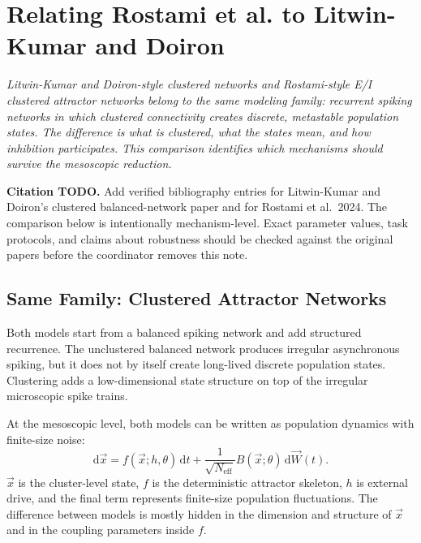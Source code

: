 \chapter{Relating Rostami et al. to Litwin-Kumar and Doiron}
\label{ch:rostami-to-litwin-kumar-doiron}

\textit{Litwin-Kumar and Doiron-style clustered networks and Rostami-style E/I clustered attractor networks belong to the same modeling family: recurrent spiking networks in which clustered connectivity creates discrete, metastable population states. The difference is what is clustered, what the states mean, and how inhibition participates. This comparison identifies which mechanisms should survive the mesoscopic reduction.}

\noindent\textbf{Citation TODO.} Add verified bibliography entries for Litwin-Kumar and Doiron's clustered balanced-network paper and for Rostami et al.\ 2024. The comparison below is intentionally mechanism-level. Exact parameter values, task protocols, and claims about robustness should be checked against the original papers before the coordinator removes this note.

\section{Same Family: Clustered Attractor Networks}
\label{sec:same-family-clustered-attractor-networks}

Both models start from a balanced spiking network and add structured recurrence. The unclustered balanced network produces irregular asynchronous spiking, but it does not by itself create long-lived discrete population states. Clustering adds a low-dimensional state structure on top of the irregular microscopic spike trains.

At the mesoscopic level, both models can be written as population dynamics with finite-size noise:
%
\begin{equation}
  \mathrm{d}\vec x
  =
  f(\vec x;h,\theta)\,\mathrm{d}t
  +
  \frac{1}{\sqrt{N_{\mathrm{eff}}}}
  B(\vec x;\theta)\,\mathrm{d}\vec W(t).
  \label{eq:shared-clustered-attractor-form}
\end{equation}
%
$\vec x$ is the cluster-level state, $f$ is the deterministic attractor skeleton, $h$ is external drive, and the final term represents finite-size population fluctuations. The difference between models is mostly hidden in the dimension and structure of $\vec x$ and in the coupling parameters inside $f$.

